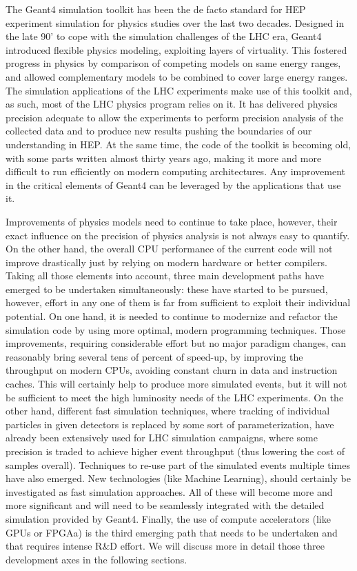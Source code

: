 \documentclass[11pt,a4paper]{article}
\begin{document}
The Geant4 simulation toolkit has been the de facto standard for HEP
experiment simulation for physics studies over the last two decades.
Designed in the late 90' to cope with the simulation challenges of the
LHC era, Geant4 introduced flexible physics modeling, exploiting layers
of virtuality. This fostered progress in physics by comparison of
competing models on same energy ranges, and allowed complementary models
to be combined to cover large energy ranges. The simulation applications
of the LHC experiments make use of this toolkit and, as such, most of
the LHC physics program relies on it. It has delivered physics precision
adequate to allow the experiments to perform precision analysis of the
collected data and to produce new results pushing the boundaries of our
understanding in HEP. At the same time, the code of the toolkit is
becoming old, with some parts written almost thirty years ago, making it
more and more difficult to run efficiently on modern computing
architectures. Any improvement in the critical elements of Geant4 can be
leveraged by the applications that use it.

Improvements of physics models need to continue to take place, however,
their exact influence on the precision of physics analysis is not always
easy to quantify. On the other hand, the overall CPU performance of the
current code will not improve drastically just by relying on modern
hardware or better compilers. Taking all those elements into account,
three main development paths have emerged to be undertaken
simultaneously: these have started to be pursued, however, effort in any
one of them is far from sufficient to exploit their individual
potential. On one hand, it is needed to continue to modernize and
refactor the simulation code by using more optimal, modern programming
techniques. Those improvements, requiring considerable effort but no
major paradigm changes, can reasonably bring several tens of percent of
speed-up, by improving the throughput on modern CPUs, avoiding constant
churn in data and instruction caches. This will certainly help to
produce more simulated events, but it will not be sufficient to meet the
high luminosity needs of the LHC experiments. On the other hand,
different fast simulation techniques, where tracking of individual
particles in given detectors is replaced by some sort of
parameterization, have already been extensively used for LHC simulation
campaigns, where some precision is traded to achieve higher event
throughput (thus lowering the cost of samples overall). Techniques to
re-use part of the simulated events multiple times have also emerged.
New technologies (like Machine Learning), should certainly be
investigated as fast simulation approaches. All of these will become
more and more significant and will need to be seamlessly integrated with
the detailed simulation provided by Geant4. Finally, the use of compute
accelerators (like GPUs or FPGAa) is the third emerging path that needs
to be undertaken and that requires intense R\&D effort. We will discuss
more in detail those three development axes in the following sections.
\end{document}
